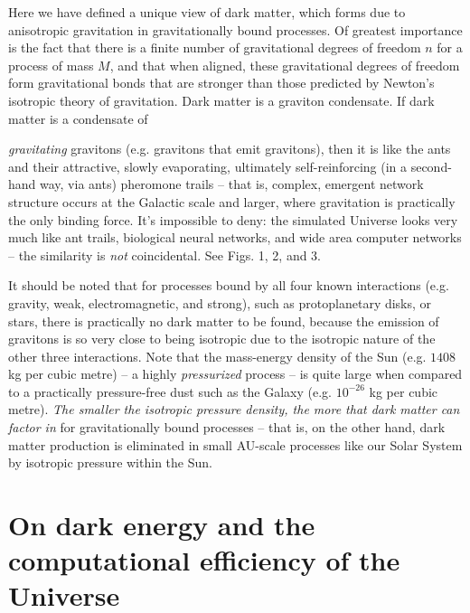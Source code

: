 \documentclass[12pt]{article}
\begin{document}
Here we have defined a unique view of dark matter, which forms due to anisotropic gravitation in gravitationally bound processes.
Of greatest importance is the fact that there is a finite number of gravitational degrees of freedom $n$ for a process of mass $M$, and that when aligned, these gravitational degrees of freedom form gravitational bonds that are stronger than those predicted by Newton's isotropic theory of gravitation.
Dark matter is a graviton {{condensate}}.
If dark matter is a condensate of {\textit{gravitating} gravitons (e.g. gravitons that emit gravitons), then it is like the ants and their attractive, slowly evaporating, ultimately self-reinforcing (in a second-hand way, via ants) pheromone trails -- that is, complex, emergent network structure occurs at the Galactic scale and larger, where gravitation is practically the only binding force.
It's impossible to deny: the simulated Universe looks very much like ant trails, biological neural networks, and wide area computer networks -- the similarity is {\textit{not}} coincidental.
See Figs. 1, 2, and 3.

It should be noted that for processes bound by all four known interactions (e.g. gravity, weak, electromagnetic, and strong), such as protoplanetary disks, or stars, there is practically no dark matter to be found, because the emission of gravitons is so very close to being isotropic due to the isotropic nature of the other three interactions.
Note that the mass-energy density of the Sun (e.g. $1408$ kg per cubic metre) -- a highly {\textit{pressurized}} process -- is quite large when compared to a practically pressure-free dust such as the Galaxy (e.g. $10^{-26}$ kg per cubic metre).
{\textit{The smaller the isotropic pressure density, the more that dark matter can factor in}} for gravitationally bound processes -- that is, on the other hand, dark matter production is eliminated in small AU-scale processes like our Solar System by isotropic pressure within the Sun.









\section{On dark energy and the computational efficiency of the Universe}

}
\end{document}
